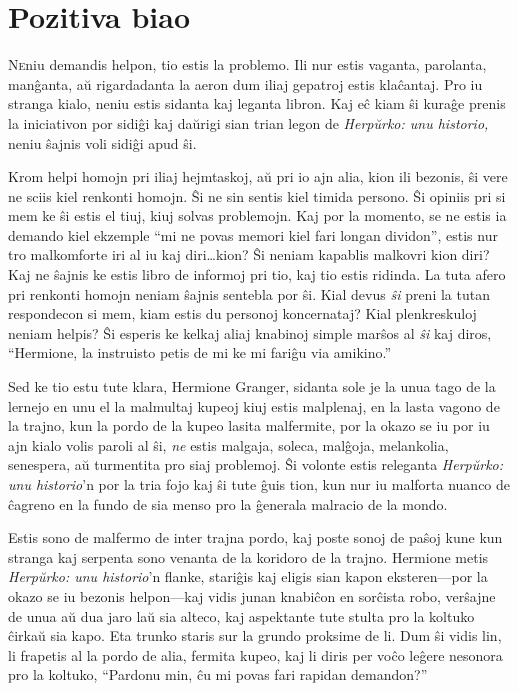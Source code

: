 \chapter {Pozitiva biao}

\lettrine{N}eniu demandis helpon, tio estis la problemo. Ili nur estis
vaganta, parolanta, manĝanta, aŭ rigardadanta la aeron dum iliaj
gepatroj estis klaĉantaj. Pro iu stranga kialo, neniu estis sidanta
kaj leganta libron. Kaj eĉ kiam ŝi kuraĝe prenis la iniciativon por
sidiĝi kaj daŭrigi sian trian legon de \emph{Herpŭrko: unu historio,}
neniu ŝajnis voli sidiĝi apud ŝi.

Krom helpi homojn pri iliaj hejmtaskoj, aŭ pri io ajn alia, kion ili
bezonis, ŝi vere ne sciis kiel renkonti homojn. Ŝi ne sin sentis kiel
timida persono. Ŝi opiniis pri si mem ke ŝi estis el tiuj, kiuj solvas
problemojn. Kaj por la momento, se ne estis ia demando kiel ekzemple
``mi ne povas memori kiel fari longan dividon'', estis nur tro
malkomforte iri al iu kaj diri\ldots kion? Ŝi neniam kapablis malkovri
kion diri? Kaj ne ŝajnis ke estis libro de informoj pri tio, kaj tio
estis ridinda. La tuta afero pri renkonti homojn neniam ŝajnis
sentebla por ŝi. Kial devus \emph{ŝi} preni la tutan respondecon si
mem, kiam estis du personoj koncernataj? Kial plenkreskuloj neniam
helpis?  Ŝi esperis ke kelkaj aliaj knabinoj simple marŝos al
\emph{ŝi} kaj diros, ``Hermione, la instruisto petis de mi ke mi
fariĝu via amikino.''

Sed ke tio estu tute klara, Hermione Granger, sidanta sole je la unua
tago de la lernejo en unu el la malmultaj kupeoj kiuj estis malplenaj,
en la lasta vagono de la trajno, kun la pordo de la kupeo lasita
malfermite, por la okazo se iu por iu ajn kialo volis paroli al ŝi,
\emph{ne} estis malgaja, soleca, malĝoja, melankolia, senespera, aŭ
turmentita pro siaj problemoj. Ŝi volonte estis releganta
\emph{Herpŭrko: unu historio}'n por la tria fojo kaj ŝi tute ĝuis
tion, kun nur iu malforta nuanco de ĉagreno en la fundo de sia menso
pro la ĝenerala malracio de la mondo.

Estis sono de malfermo de inter trajna pordo, kaj poste sonoj de paŝoj
kune kun stranga kaj serpenta sono venanta de la koridoro de la
trajno. Hermione metis \emph{Herpŭrko: unu historio}'n flanke,
stariĝis kaj eligis sian kapon eksteren—por la okazo se iu bezonis
helpon—kaj vidis junan knabiĉon en sorĉista robo, verŝajne de unua aŭ
dua jaro laŭ sia alteco, kaj aspektante tute stulta pro la koltuko
ĉirkaŭ sia kapo. Eta trunko staris sur la grundo proksime de li. Dum
ŝi vidis lin, li frapetis al la pordo de alia, fermita kupeo, kaj li
diris per voĉo leĝere nesonora pro la koltuko, ``Pardonu min, ĉu mi
povas fari rapidan demandon?''

